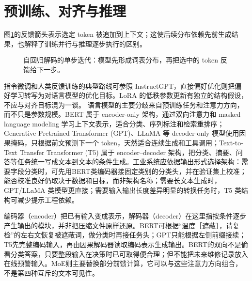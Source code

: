\section{预训练、对齐与推理}
图\ref{fig:llm-decoding-loop}的反馈箭头表示选定 token 被追加到上下文；这使后续分布依赖先前生成结果，也解释了训练并行与推理逐步执行的区别。
\begin{figure}[htbp]
\centering
{}
\caption{自回归解码的单步迭代：模型先形成词表分布，再把选中的 token 反馈给下一步。}
\label{fig:llm-decoding-loop}
\end{figure}
指令微调和人类反馈训练的典型路线可参照 InstructGPT，直接偏好优化则把偏好学习转写为对语言模型的优化目标\cite{ouyang2022instruct,rafailov2023dpo}。LoRA 的低秩参数更新有独立的结构假设\cite{hu2021lora}，不应与对齐目标混为一谈。
语言模型的主要分歧来自预训练任务和注意力方向，而不只是参数规模。BERT 属于 encoder-only 架构，通过双向注意力和 masked language modeling 学习上下文表示，适合分类、序列标注和检索重排序；Generative Pretrained Transformer (GPT)、LLaMA 等 decoder-only 模型使用因果掩码，只根据前文预测下一个 token，天然适合连续生成和工具调用；Text-to-Text Transfer Transformer (T5) 属于 encoder--decoder 架构，把分类、摘要、问答等任务统一写成文本到文本的条件生成。工业系统应依据输出形式选择架构：需要字段分类时，可先用BERT类编码器接固定类别的分类头，并在验证集上校准；能否校准良好仍取决于数据和目标，而非架构名称；需要长文本生成时，GPT/LLaMA 类模型更直接；需要输入输出长度差异明显的转换任务时，T5 类结构可减少提示工程依赖。

编码器（encoder）把已有输入变成表示，解码器（decoder）在这里指按条件逐步产生输出的模块，并非把压缩文件原样还原。BERT可根据“温度［遮蔽］，请复检”的左右文恢复被遮蔽词，做分类时再接任务头；GPT只能根据左侧前缀接续；T5先完整编码输入，再由因果解码器读取编码表示生成输出。BERT的双向不是偷看分类答案，只要整段输入在决策时已可取得便合理；但不能把未来维修记录放入在线预警输入。MoE则主要替换部分前馈计算，它可以与这些注意力方向组合，不是第四种互斥的文本可见性。

